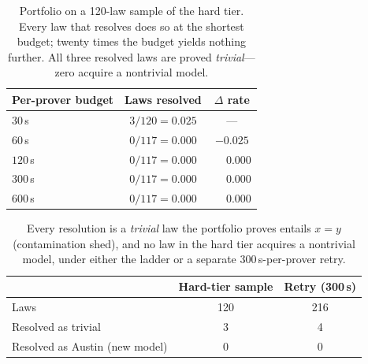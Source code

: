 

\begin{table}[t]
\centering
\small
\begin{tabular}{lcc}
\toprule
Per-prover budget & Laws resolved & $\Delta$ rate \\
\midrule
$30$\,s  & $3/120 = 0.025$ & --- \\
$60$\,s  & $0/117 = 0.000$ & $-0.025$ \\
$120$\,s & $0/117 = 0.000$ & $\phantom{-}0.000$ \\
$300$\,s & $0/117 = 0.000$ & $\phantom{-}0.000$ \\
$600$\,s & $0/117 = 0.000$ & $\phantom{-}0.000$ \\
\bottomrule
\end{tabular}
\caption{Portfolio on a 120-law sample of the hard tier. Every law that resolves does so
at the shortest budget; twenty times the budget yields nothing further. All three resolved
laws are proved \emph{trivial}---zero acquire a nontrivial model.}
\label{tab:baseline}
\end{table}


\begin{table}[t]
\centering
\small
\begin{tabular}{lcc}
\toprule
 & Hard-tier sample & Retry (300\,s) \\
\midrule
Laws                       & 120 & 216 \\
Resolved as trivial        & 3   & 4 \\
Resolved as Austin (new model) & 0 & 0 \\
\bottomrule
\end{tabular}
\caption{Every resolution is a \emph{trivial} law the portfolio proves entails $x=y$
(contamination shed), and no law in the hard tier acquires a nontrivial model, under
either the ladder or a separate $300$\,s-per-prover retry. %
}
\label{tab:verdicts}
\end{table}
